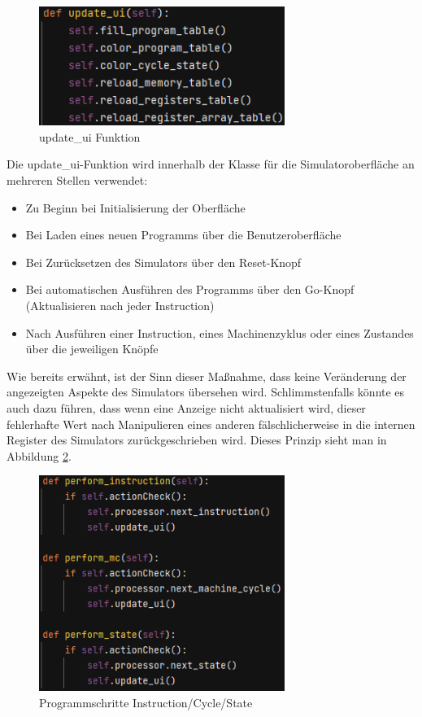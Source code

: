 \documentclass[12pt]{article}
\newcommand{\imgSpaceBefore}{\vspace{10pt}}
\begin{document}
\begin{figure}[H]
\centering
\includegraphics[width=8cm]{bilder/updateUI}
\caption{update\_ui Funktion}
\label{fig:updateUI}
\end{figure}

\noindent
Die \glqq update\_ui\grqq-Funktion wird innerhalb der Klasse für die Simulatoroberfläche an mehreren Stellen verwendet:\imgSpaceBefore

\begin{itemize}
	\item Zu Beginn bei Initialisierung der Oberfläche
	\item Bei Laden eines neuen Programms über die Benutzeroberfläche
	\item Bei Zurücksetzen des Simulators über den Reset-Knopf
	\item Bei automatischen Ausführen des Programms über den Go-Knopf (Aktualisieren nach jeder Instruction)
	\item Nach Ausführen einer Instruction, eines Machinenzyklus oder eines Zustandes über die jeweiligen Knöpfe
\end{itemize}

\noindent
Wie bereits erwähnt, ist der Sinn dieser Maßnahme, dass keine Veränderung der angezeigten Aspekte des Simulators übersehen wird. Schlimmstenfalls könnte es auch dazu führen, dass wenn eine Anzeige nicht aktualisiert wird, dieser fehlerhafte Wert nach Manipulieren eines anderen fälschlicherweise in die internen Register des Simulators zurückgeschrieben wird. Dieses Prinzip sieht man in Abbildung \ref{fig:perf}.\imgSpaceBefore

\begin{figure}[H]
\centering
\includegraphics[width=8cm]{bilder/Perform}
\caption{Programmschritte Instruction/Cycle/State}
\label{fig:perf}
\end{figure}
\end{document}
